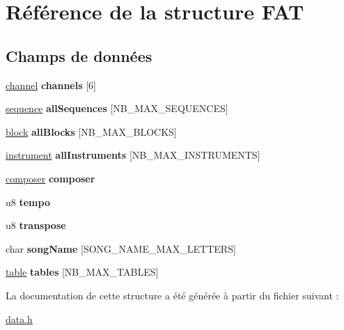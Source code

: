 \hypertarget{struct_f_a_t}{
\section{Référence de la structure FAT}
\label{struct_f_a_t}
}
\subsection*{Champs de données}
\begin{DoxyCompactItemize}
\item 
\hypertarget{struct_f_a_t_a87102826e08bc9bdb2ca1bf0b53f8ac9}{
\hyperlink{struct_c_h_a_n_n_e_l}{channel} {\bfseries channels} \mbox{[}6\mbox{]}}
\label{struct_f_a_t_a87102826e08bc9bdb2ca1bf0b53f8ac9}

\item 
\hypertarget{struct_f_a_t_aedb7f8fa6f53bd2273c70a9febd76aaa}{
\hyperlink{struct_s_e_q_u_e_n_c_e}{sequence} {\bfseries allSequences} \mbox{[}NB\_\-MAX\_\-SEQUENCES\mbox{]}}
\label{struct_f_a_t_aedb7f8fa6f53bd2273c70a9febd76aaa}

\item 
\hypertarget{struct_f_a_t_ac7fd37a6fdc98d68f68a4ca0082a31a0}{
\hyperlink{struct_b_l_o_c_k}{block} {\bfseries allBlocks} \mbox{[}NB\_\-MAX\_\-BLOCKS\mbox{]}}
\label{struct_f_a_t_ac7fd37a6fdc98d68f68a4ca0082a31a0}

\item 
\hypertarget{struct_f_a_t_af95be502ce562f33d068959c2d3a6c14}{
\hyperlink{struct_i_n_s_t_r_u_m_e_n_t}{instrument} {\bfseries allInstruments} \mbox{[}NB\_\-MAX\_\-INSTRUMENTS\mbox{]}}
\label{struct_f_a_t_af95be502ce562f33d068959c2d3a6c14}

\item 
\hypertarget{struct_f_a_t_a5295928ddfd03f71d0fe60e2877b253a}{
\hyperlink{struct_c_o_m_p_o_s_e_r}{composer} {\bfseries composer}}
\label{struct_f_a_t_a5295928ddfd03f71d0fe60e2877b253a}

\item 
\hypertarget{struct_f_a_t_a818a64490682a41a13e442b417bcb459}{
u8 {\bfseries tempo}}
\label{struct_f_a_t_a818a64490682a41a13e442b417bcb459}

\item 
\hypertarget{struct_f_a_t_a841401a367ef1cd53370b5c66363bdc9}{
u8 {\bfseries transpose}}
\label{struct_f_a_t_a841401a367ef1cd53370b5c66363bdc9}

\item 
\hypertarget{struct_f_a_t_a21b7fa961fccb52ae1decc3ab2fe9bd5}{
char {\bfseries songName} \mbox{[}SONG\_\-NAME\_\-MAX\_\-LETTERS\mbox{]}}
\label{struct_f_a_t_a21b7fa961fccb52ae1decc3ab2fe9bd5}

\item 
\hypertarget{struct_f_a_t_ae51db5320b24fb28d769019f35c2051f}{
\hyperlink{struct_t_a_b_l_e}{table} {\bfseries tables} \mbox{[}NB\_\-MAX\_\-TABLES\mbox{]}}
\label{struct_f_a_t_ae51db5320b24fb28d769019f35c2051f}

\end{DoxyCompactItemize}


La documentation de cette structure a été générée à partir du fichier suivant :\begin{DoxyCompactItemize}
\item 
\hyperlink{data_8h}{data.h}\end{DoxyCompactItemize}
